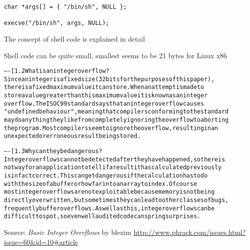\documentclass[Screen16to9,17pt]{foils}
\begin{document}

\begin{verbatim}
char *args[] = { "/bin/sh", NULL };

execve("/bin/sh", args, NULL);
\end{verbatim}


\begin{list2}
\item The concept of shell code is explained in detail
\item Shell code can be quite small, smallest seems to be 21 bytes for Linux x86
\end{list2}



\begin{alltt}\footnotesize
----[ 1.2 What is an integer overflow?
Since an integer is a fixed size (32 bits for the purposes of this paper),
there is a fixed maximum value it can store.  When an attempt is made to
store a value greater than this maximum value it is known as an integer
overflow.  The ISO C99 standard says that an integer overflow causes
"undefined behaviour", meaning that compilers conforming to the standard
may do anything they like from completely ignoring the overflow to aborting
the program.  Most compilers seem to ignore the overflow, resulting in an
unexpected or erroneous result being stored.

----[ 1.3 Why can they be dangerous?
Integer overflows cannot be detected after they have happened, so there is
not way for an application to tell if a result it has calculated previously
is in fact correct.  This can get dangerous if the calculation has to do
with the size of a buffer or how far into an array to index.  Of course
most integer overflows are not exploitable because memory is not being
directly overwritten, but sometimes they can lead to other classes of bugs,
frequently buffer overflows.  As well as this, integer overflows can be
difficult to spot, so even well audited code can spring surprises.
\end{alltt}

Source:
\emph{Basic Integer Overflows} by blexim
\url{http://www.phrack.com/issues.html?issue=60&id=10#article}

\end{document}
